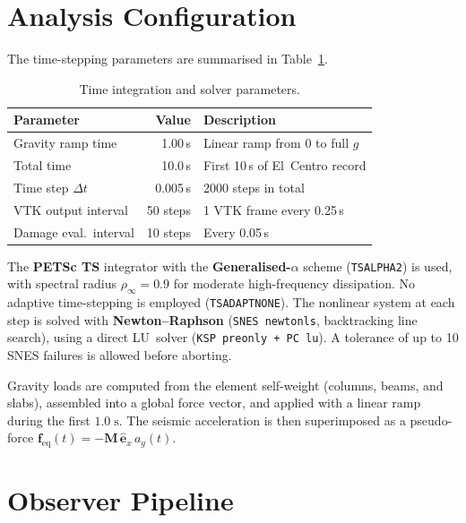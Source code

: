 \section{Analysis Configuration}
\label{sec:seismic-rc-config}

The time-stepping parameters are summarised in
Table~\ref{tab:seismic-rc-config}.

\begin{table}[htbp]
\centering
\caption{Time integration and solver parameters.}
\label{tab:seismic-rc-config}
\begin{tabular}{@{} l r l @{}}
\toprule
\textbf{Parameter} & \textbf{Value} & \textbf{Description} \\
\midrule
Gravity ramp time     & 1.00\,s   & Linear ramp from $0$ to full $g$ \\
Total time            & 10.0\,s   & First 10\,s of El~Centro record \\
Time step $\Delta t$  & 0.005\,s  & 2000 steps in total \\
VTK output interval   & 50 steps  & 1 VTK frame every 0.25\,s \\
Damage eval.\ interval & 10 steps & Every 0.05\,s \\
\bottomrule
\end{tabular}
\end{table}

The \textbf{PETSc TS} integrator with the \textbf{Generalised-$\alpha$}
scheme (\texttt{TSALPHA2}) is used, with spectral radius
$\rho_\infty = 0.9$ for moderate high-frequency dissipation.  No
adaptive time-stepping is employed (\texttt{TSADAPTNONE}).  The
nonlinear system at each step is solved with \textbf{Newton--Raphson}
(\texttt{SNES~newtonls}, backtracking line search), using a direct
LU~solver (\texttt{KSP~preonly + PC~lu}).  A tolerance of up to 10
SNES failures is allowed before aborting.

Gravity loads are computed from the element self-weight (columns, beams,
and slabs), assembled into a global force vector, and applied with a
linear ramp during the first $1.0\;\mathrm{s}$.  The seismic
acceleration is then superimposed as a pseudo-force
$\mathbf{f}_\mathrm{eq}(t) = -\mathbf{M}\,\hat{\mathbf{e}}_x\,a_g(t)$.


\section{Observer Pipeline}
\label{sec:seismic-rc-observers}

